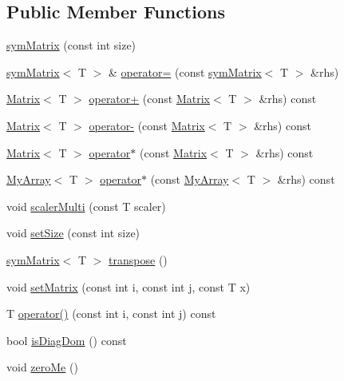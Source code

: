 \subsection*{Public Member Functions}
\begin{DoxyCompactItemize}
\item 
\hyperlink{classsymMatrix_a7ccbe6ae7b25b2705fdf6fce29699d26}{sym\+Matrix} (const int size)
\item 
\hyperlink{classsymMatrix}{sym\+Matrix}$<$ T $>$ \& \hyperlink{classsymMatrix_ae2c26b03d13d63952f6052f88869b2e2}{operator=} (const \hyperlink{classsymMatrix}{sym\+Matrix}$<$ T $>$ \&rhs)
\item 
\hyperlink{classMatrix}{Matrix}$<$ T $>$ \hyperlink{classsymMatrix_a47071a21daf752e9a378c593ef85dbb2}{operator+} (const \hyperlink{classMatrix}{Matrix}$<$ T $>$ \&rhs) const 
\item 
\hyperlink{classMatrix}{Matrix}$<$ T $>$ \hyperlink{classsymMatrix_aaa418f9273ccc5da9d01c645e78ef657}{operator-\/} (const \hyperlink{classMatrix}{Matrix}$<$ T $>$ \&rhs) const 
\item 
\hyperlink{classMatrix}{Matrix}$<$ T $>$ \hyperlink{classsymMatrix_a4c1a9a20ab9bd68aca9f9d35d25e0e36}{operator$\ast$} (const \hyperlink{classMatrix}{Matrix}$<$ T $>$ \&rhs) const 
\item 
\hyperlink{classMyArray}{My\+Array}$<$ T $>$ \hyperlink{classsymMatrix_aa7adbc9378944126e08af6072ff648eb}{operator$\ast$} (const \hyperlink{classMyArray}{My\+Array}$<$ T $>$ \&rhs) const 
\item 
void \hyperlink{classsymMatrix_a75cb07e28a2ef936e45a7e3324429667}{scaler\+Multi} (const T scaler)
\item 
void \hyperlink{classsymMatrix_a06379c2668a6b1fba8b133d753a8f57c}{set\+Size} (const int size)
\item 
\hyperlink{classsymMatrix}{sym\+Matrix}$<$ T $>$ \hyperlink{classsymMatrix_aa3cfa46104ea3a5a6095ab20668a5445}{transpose} ()
\item 
void \hyperlink{classsymMatrix_a28d1f286c0a8572a26441afd635cba51}{set\+Matrix} (const int i, const int j, const T x)
\item 
T \hyperlink{classsymMatrix_a92bbf3194f8bf52559ee19ba706dd15c}{operator()} (const int i, const int j) const 
\item 
bool \hyperlink{classsymMatrix_a43d26e87d92d368544b9bd6384da8121}{is\+Diag\+Dom} () const 
\item 
void \hyperlink{classsymMatrix_adaa6f70fb421576d245f86c526b64ac1}{zero\+Me} ()
\end{DoxyCompactItemize}
